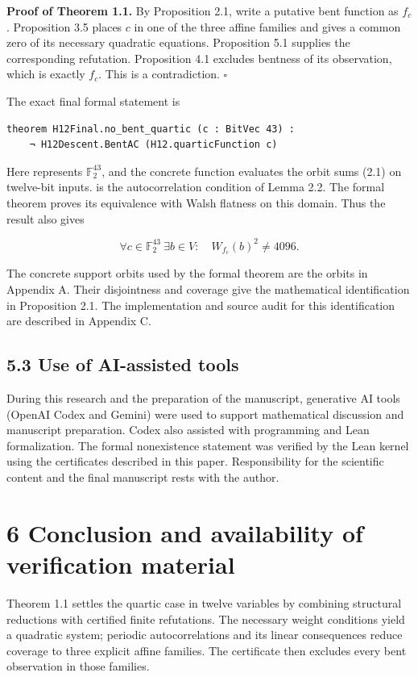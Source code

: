 \documentclass[11pt,a4paper]{article}
\begin{document}
\textbf{Proof of Theorem 1.1.} By Proposition 2.1, write a putative bent function as $f_c$. Proposition 3.5 places $c$ in one of the three affine families and gives a common zero of its necessary quadratic equations. Proposition 5.1 supplies the corresponding refutation. Proposition 4.1 excludes bentness of its observation, which is exactly $f_c$. This is a contradiction. \hfill$\square$

The exact final formal statement is

\begin{verbatim}
theorem H12Final.no_bent_quartic (c : BitVec 43) :
    ¬ H12Descent.BentAC (H12.quarticFunction c)
\end{verbatim}

Here  represents $\mathbb F_2^{43}$, and the concrete function evaluates the orbit sums (2.1) on twelve-bit inputs.  is the autocorrelation condition of Lemma 2.2. The formal theorem  proves its equivalence with Walsh flatness on this domain. Thus the result also gives

\[
\forall c\in\mathbb F_2^{43}\ \exists b\in V:\quad W_{f_c}(b)^2\ne4096. \tag{5.1}
\]

The concrete support orbits used by the formal theorem are the orbits in Appendix A. Their disjointness and coverage give the mathematical identification in Proposition 2.1. The implementation and source audit for this identification are described in Appendix C.

\subsection*{5.3 Use of AI-assisted tools}

During this research and the preparation of the manuscript, generative AI tools (OpenAI Codex and Gemini) were used to support mathematical discussion and manuscript preparation. Codex also assisted with programming and Lean formalization. The formal nonexistence statement was verified by the Lean kernel using the certificates described in this paper. Responsibility for the scientific content and the final manuscript rests with the author.

\section*{6 Conclusion and availability of verification material}

Theorem 1.1 settles the quartic case in twelve variables by combining structural reductions with certified finite refutations. The necessary weight conditions yield a quadratic system; periodic autocorrelations and its linear consequences reduce coverage to three explicit affine families. The certificate then excludes every bent observation in those families.
\end{document}
